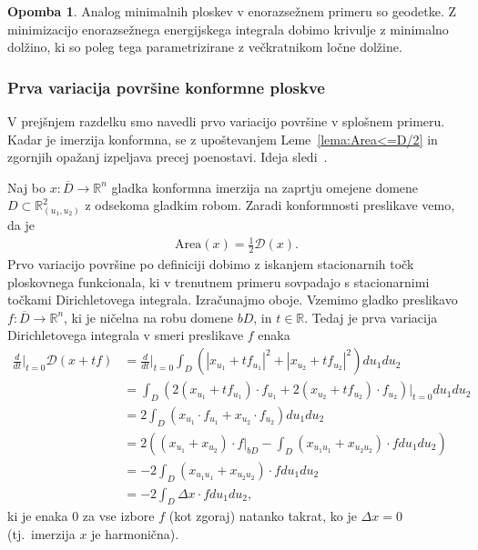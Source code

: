 \documentclass[12pt,a4paper,twoside]{article}
\theoremstyle{definition} %
\newtheorem{opomba}[definicija]{Opomba}
\theoremstyle{plain} %
\numberwithin{equation}{section}  %
\newcommand{\R}{\mathbb R}
\begin{document}
\begin{opomba}
Analog minimalnih ploskev v enorazsežnem primeru so geodetke. Z minimizacijo enorazsežnega energijskega integrala dobimo krivulje z minimalno dolžino, ki so poleg tega parametrizirane z večkratnikom ločne dolžine. 
\end{opomba}

\subsubsection{Prva variacija površine konformne ploskve}
% 
V prejšnjem razdelku smo navedli prvo variacijo površine v splošnem primeru. Kadar je imerzija konformna, se z upoštevanjem Leme~\ref{lema:Area<=D/2} in zgornjih opažanj izpeljava precej poenostavi. Ideja sledi~\cite[Section~2.2]{forstneric2021minimals}.

Naj bo $x \colon \overline{D} \to \R^{n}$ gladka konformna imerzija na zaprtju omejene domene $D \subset \R_{(u_1,u_2)}^2$ z odsekoma gladkim robom. 
Zaradi konformnosti preslikave vemo, da je
\begin{gather*}
\text{Area}(x) = \frac{1}{2} \mathcal{D}(x).
\end{gather*}
Prvo variacijo površine po definiciji dobimo z iskanjem stacionarnih točk ploskovnega funkcionala, ki v trenutnem primeru sovpadajo s stacionarnimi točkami Dirichletovega integrala. Izračunajmo oboje. \newline
Vzemimo gladko preslikavo $f \colon \overline{D} \to \R^{n}$, ki je ničelna na robu domene $bD$, in $t \in \R$. Tedaj je prva variacija Dirichletovega integrala v smeri preslikave $f$ enaka
\begin{align*}
\frac{d}{dt} \Big|_{t=0} \mathcal{D}(x+tf) &= \frac{d}{dt} \Big|_{t=0} \int_{D} \left( |x_{u_1}+tf_{u_1}|^2 + |x_{u_2}+tf_{u_2}|^2 \right) du_1 du_2 \\
	&= \int_{D} \left( 2(x_{u_1}+tf_{u_1}) \cdot f_{u_1} + 2(x_{u_2}+tf_{u_2}) \cdot f_{u_2} \right) \big|_{t=0} du_1 du_2 \\
	&= 2 \int_{D} \left( x_{u_1} \cdot f_{u_1} + x_{u_2} \cdot f_{u_2} \right) du_1 du_2 \\
	&= 2 \left( (x_{u_1} + x_{u_2}) \cdot f \big|_{bD} - \int_{D} (x_{u_1 u_1} + x_{u_2 u_2}) \cdot f du_1 du_2 \right) \\
	&= -2 \int_{D} (x_{u_1 u_1} + x_{u_2 u_2}) \cdot f du_1 du_2 \\ 
	&= -2 \int_{D} \Delta{x} \cdot f du_1 du_2,
\end{align*}
ki je enaka $0$ za vse izbore $f$ (kot zgoraj) natanko takrat, ko je $\Delta{x} = 0$ (tj.~imerzija $x$ je harmonična). 
\end{document}
